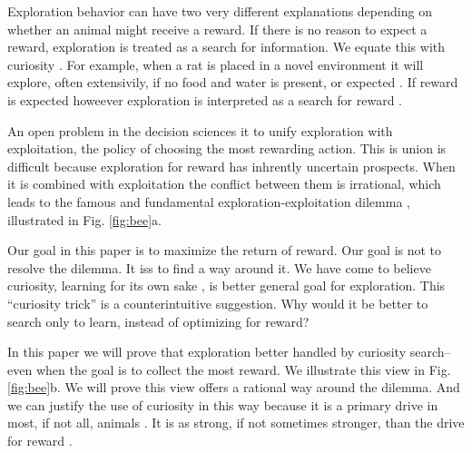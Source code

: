 Exploration behavior can have two very different explanations depending on whether an animal might receive a reward. If there is no reason to expect a reward, exploration is treated as a search for information. We equate this with curiosity \cite{Berlyne1950,Schmidhuber1991,Kidd2015,Jaegle2019,Friston2016,Sumner2019,Calhoun2014,Wang2019,Auersperg2015}. For example, when a rat is placed in a novel environment it will explore, often extensivily, if no food and water is present, or expected \cite{Berlyne1950}. If reward is expected howeever exploration is interpreted as a search for reward \cite{Gupta2006,Sutton2018,Woodgate2017,Lee2011a,Schulz2018a,Calhoun2014}.

An open problem in the decision sciences it to unify exploration with exploitation, the policy of choosing the most rewarding action. This is union is difficult because exploration for reward has inhrently uncertain prospects. When it is combined with exploitation the conflict between them is irrational, which leads to the famous and fundamental exploration-exploitation dilemma \citep{Kelly1956,Berger-Tal2014,Dayan1996,Thrun1992,Mehlhorn2015,Kobayashi2019}, illustrated in Fig. \ref{fig:bee}a.

Our goal in this paper is to maximize the return of reward. Our goal is not to resolve the dilemma. It iss to find a way around it. We have come to believe curiosity, learning for its own sake \cite{Loewenstein1994,Kidd2015,Gopnik2020}, is better general goal for exploration. This ``curiosity trick'' is a counterintuitive suggestion. Why would it be better to search only to learn, instead of optimizing for reward? 

In this paper we will prove that exploration better handled by curiosity search--even when the goal is to collect the most reward. We illustrate this view in Fig. \ref{fig:bee}b. We will prove this view offers a rational way around the dilemma. And we can justify the use of curiosity in this way because it is a primary drive in most, if not all, animals \cite{Berlyne1950,Loewenstein1994,Inglis2001}. It is as strong, if not sometimes stronger, than the drive for reward \cite{Loewenstein1994,Kidd2015,Gottlieb2018,Sumner2019,Gopnik2020,Song2019,Wang2019}.

